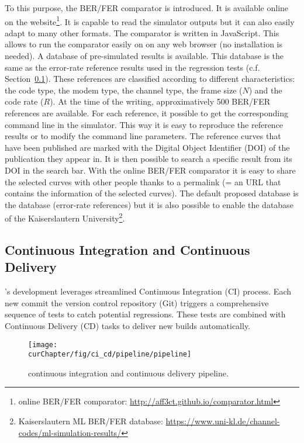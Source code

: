 To this purpose, the BER/FER comparator is introduced. It is available
online on the \AFFECT website\footnote{\AFFECT online BER/FER comparator:
\url{http://aff3ct.github.io/comparator.html}}. It is capable to read the
\AFFECT simulator outputs but it can also easily adapt to many other formats.
The comparator is written in JavaScript. This allows to run the comparator
easily on on any web browser (no installation is needed). A database of \AFFECT
pre-simulated results is available. This database is the same as the error-rate
reference results used in the regression tests (c.f.
Section~\ref{sec:aff3ct_ci_cd}). These references are classified according to
different characteristics: the code type, the modem type, the channel type,
the frame size ($N$) and the code rate ($R$). At the time of the writing,
approximatively 500 BER/FER references are available. For each reference, it
possible to get the corresponding command line in the \AFFECT simulator. This
way it is easy to reproduce the reference results or to modify the command line
parameters. The reference curves that have been published are marked with
the Digital Object Identifier (DOI) of the publication they appear in. It is
then possible to search a specific result from its DOI in the search bar. With
the online BER/FER comparator it is easy to share the selected curves with other
people thanks to a permalink (= an URL that contains the information of the
selected curves). The default proposed database is the \AFFECT database
(error-rate references) but it is also possible to enable the database of the
Kaiserslautern University\footnote{Kaiserslautern ML BER/FER database:
\url{https://www.uni-kl.de/channel-codes/ml-simulation-results/}}.

\subsection{Continuous Integration and Continuous Delivery}
\label{sec:aff3ct_ci_cd}

\AFFECT's development leverages streamlined Continuous Integration (CI) process.
Each new commit the version control repository (Git) triggers a comprehensive
sequence of tests to catch potential regressions. These tests are combined with
Continuous Delivery (CD) tasks to deliver new \AFFECT builds automatically.

\begin{figure}[htp]
  \centering
  \texttt{[image: \\curChapter/fig/ci\_cd/pipeline/pipeline]}
  \caption{\AFFECT continuous integration and continuous delivery pipeline.}
  \label{fig:aff3ct_ci_cd_pipeline}
\end{figure}

